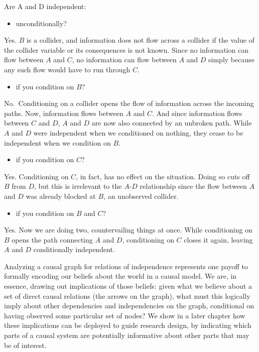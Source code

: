 \documentclass[
  12pt,
]{book}
\providecommand{\tightlist}{%
  \setlength{\itemsep}{0pt}\setlength{\parskip}{0pt}}
\begin{document}
Are A and D independent:

\begin{itemize}
\tightlist
\item
  unconditionally?
\end{itemize}

Yes. \(B\) is a collider, and information does not flow across a collider if the value of the collider variable or its consequences is not known. Since no information can flow between \(A\) and \(C\), no information can flow between \(A\) and \(D\) simply because any such flow would have to run through \(C\).

\begin{itemize}
\tightlist
\item
  if you condition on \(B\)?
\end{itemize}

No.~Conditioning on a collider opens the flow of information across the incoming paths. Now, information flows between \(A\) and \(C\). And since information flows between \(C\) and \(D\), \(A\) and \(D\) are now also connected by an unbroken path. While \(A\) and \(D\) were independent when we conditioned on nothing, they cease to be independent when we condition on \(B\).

\begin{itemize}
\tightlist
\item
  if you condition on \(C\)?
\end{itemize}

Yes. Conditioning on \(C\), in fact, has no effect on the situation. Doing so cuts off \(B\) from \(D\), but this is irrelevant to the \(A\)-\(D\) relationship since the flow between \(A\) and \(D\) was already blocked at \(B\), an unobserved collider.

\begin{itemize}
\tightlist
\item
  if you condition on \(B\) and \(C\)?
\end{itemize}

Yes. Now we are doing two, countervailing things at once. While conditioning on \(B\) opens the path connecting \(A\) and \(D\), conditioning on \(C\) closes it again, leaving \(A\) and \(D\) conditionally independent.

Analyzing a causal graph for relations of independence represents one payoff to formally encoding our beliefs about the world in a causal model. We are, in essence, drawing out implications of those beliefs: given what we believe about a set of direct causal relations (the arrows on the graph), what must this logically imply about other dependencies and independencies on the graph, conditional on having observed some particular set of nodes? We show in a later chapter how these implications can be deployed to guide research design, by indicating which parts of a causal system are potentially informative about other parts that may be of interest.
\end{document}

